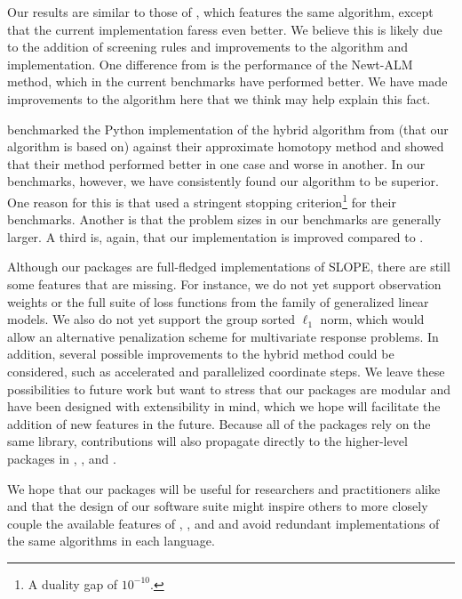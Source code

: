\documentclass[article]{jss}
\begin{document}
Our results are similar to those of \citet{larsson2023}, which features the
same algorithm, except that the current implementation faress even better. We
believe this is likely due to the addition of screening rules and improvements
to the algorithm and implementation. One difference from \citet{larsson2023} is
the performance of the Newt-ALM method, which in the current benchmarks have
performed better. We have made improvements to the algorithm here that we think may
help explain this fact.

\citet{dupuis2024} benchmarked the Python implementation of the hybrid
algorithm from \citet{larsson2023} (that our algorithm is based on) against
their approximate homotopy method and showed that their method performed better
in one case and worse in another. In our benchmarks, however, we have
consistently found our algorithm to be superior. One reason for this is that
\citet{dupuis2024} used a stringent stopping criterion\footnote{A duality
  gap of \(10^{-10}\).} for their benchmarks. Another is that the problem sizes in
our benchmarks are generally larger. A third is, again, that our implementation
is improved compared to \citet{larsson2023}.

Although our packages are full-fledged implementations of SLOPE, there are
still some features that are missing. For instance, we do not yet support
observation weights or the full suite of loss functions from the family of
generalized linear models. We also do not yet support the group sorted \(\ell_1\)
norm, which would allow an alternative penalization scheme for multivariate
response problems. In addition, several possible improvements to the hybrid
method could be considered, such as accelerated and parallelized coordinate
steps. We leave these possibilities to future work but want to stress that our
packages are modular and have been designed with extensibility in mind, which
we hope will facilitate the addition of new features in the future. Because all
of the packages rely on the same  library, contributions will
also propagate directly to the higher-level packages in ,
, and .

We hope that our packages will be useful for researchers and practitioners
alike and that the design of our software suite might inspire others to more
closely couple the available features of , , and
 and avoid redundant implementations of the same algorithms in
each language.
\end{document}
